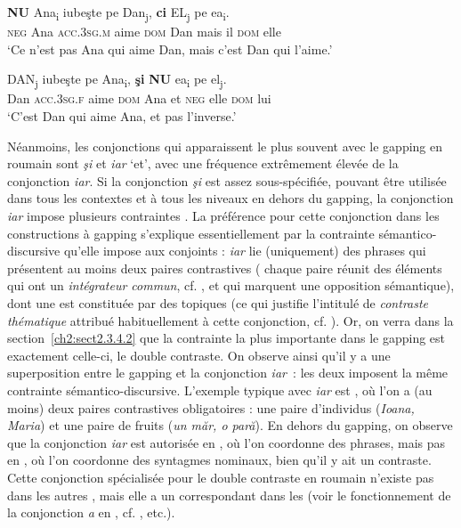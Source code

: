 \ea
\ea 
\gll \textbf{NU}  Ana\textsubscript{i}    iubeşte  pe  Dan\textsubscript{j},  \textbf{ci}  EL\textsubscript{j}  pe  ea\textsubscript{i}. \label{ch2:ex54a}\\
\textsc{neg}  Ana  \textsc{acc.3sg.m}  aime  \textsc{dom}  Dan  mais  il  \textsc{dom}  elle\\
\glt ‘Ce n’est pas Ana qui aime Dan, mais c’est Dan qui l’aime.’  

\ex 
\gll DAN\textsubscript{j}    iubeşte  pe  Ana\textsubscript{i},  \textbf{şi}  \textbf{NU}  ea\textsubscript{i}  pe  el\textsubscript{j}. \label{ch2:ex54b}\\
Dan  \textsc{acc.3sg.f}  aime  \textsc{dom}  Ana  et  \textsc{neg}  elle  \textsc{dom}  lui\\
\glt ‘C’est Dan qui aime Ana, et pas l’inverse.’
\z
\z

Néanmoins, les conjonctions qui apparaissent le plus souvent avec le gapping en roumain sont \textit{şi} et \textit{iar} ‘et’, avec une fréquence extrêmement élevée de la conjonction \textit{iar}. Si la conjonction \textit{şi} est assez sous-spécifiée, pouvant être utilisée dans tous les contextes et à tous les niveaux en dehors du gapping, la conjonction \textit{iar} impose plusieurs contraintes \citep{BilbiieEtAl2011}. La préférence pour cette conjonction dans les constructions à gapping s’explique essentiellement par la contrainte sémantico-discursive qu’elle impose aux conjoints : \textit{iar} lie (uniquement) des phrases qui présentent au moins deux paires contrastives ({\cad} chaque paire réunit des éléments qui ont un \textit{intégrateur commun}, cf. \citealt{Lang1984}, et qui marquent une opposition sémantique), dont une est constituée par des topiques (ce qui justifie l’intitulé de \textit{contraste thématique} attribué habituellement à cette conjonction, cf. \citealt{Zafiu2005}). Or, on verra dans la section~\ref{ch2:sect2.3.4.2} que la contrainte la plus importante dans le gapping est exactement celle-ci, {\cad} le double contraste. On observe ainsi qu’il y a une superposition entre le gapping et la conjonction \textit{iar~}: les deux imposent la même contrainte sémantico-discursive. L’exemple typique avec \textit{iar} est , où l’on a (au moins) deux paires contrastives obligatoires : une paire d’individus (\textit{Ioana, Maria}) et une paire de fruits (\textit{un măr, o pară}). En dehors du gapping, on observe que la conjonction \textit{iar} est autorisée en , où l’on coordonne des phrases, mais pas en , où l’on coordonne des syntagmes nominaux, bien qu’il y ait un contraste. Cette conjonction spécialisée pour le double contraste en roumain n’existe pas dans les autres , mais elle a un correspondant dans les  (voir le fonctionnement de la conjonction \textit{a} en , cf. \citealt{JasinskajaEtAl2009,Kazenin2001,Agafonova2014}, etc.).  

